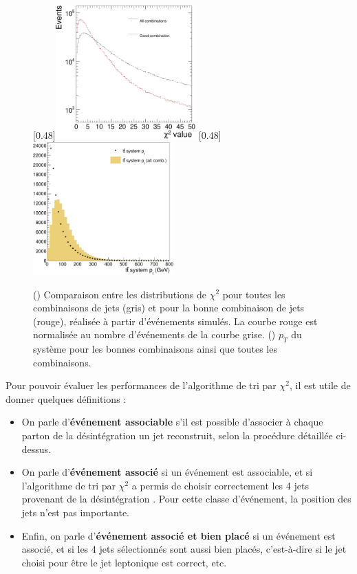 \begin{figure}[tbp] \centering
    \subcaptionbox{\label{fig:chi2_distribution}}[0.48\textwidth]{\includegraphics[width=0.48\textwidth]{chapitre6/figs/chi2/chi2_distribution.pdf}} \hfill
    \subcaptionbox{\label{fig:chi2_ptsyst}}[0.48\textwidth]{\includegraphics[width=0.48\textwidth]{chapitre6/figs/chi2/chi2_discrimant_combinations_pt_syst.pdf}}
    \caption{() Comparaison entre les distributions de $\chi^2$ pour toutes les combinaisons de jets (\textcolor{bleu_gris}{gris}) et pour la bonne combinaison de jets (\textcolor{rouge_grandmere}{rouge}), réalisée à partir d'événements \ttbar simulés. La courbe \textcolor{rouge_grandmere}{rouge} est normalisée au nombre d'événements de la courbe \textcolor{bleu_gris}{grise}. () $p_T$ du système \ttbar pour les bonnes combinaisons ainsi que toutes les combinaisons.}
\end{figure}

Pour pouvoir évaluer les performances de l'algorithme de tri par $\chi^2$, il est utile de donner quelques définitions :

\begin{itemize} \label{page:chi2_def}
    \item On parle d'\textbf{événement associable} s'il est possible d'associer à chaque parton de la désintégration \ttbar un jet reconstruit, selon la procédure détaillée ci-dessus.
    \item On parle d'\textbf{événement associé} si un événement est associable, et si l'algorithme de tri par $\chi^2$ a permis de choisir correctement les 4 jets provenant de la désintégration \ttbar. Pour cette classe d'événement, la position des jets n'est pas importante.
    \item Enfin, on parle d'\textbf{événement associé et bien placé} si un événement est associé, et si les 4 jets sélectionnés sont aussi bien placés, c'est-à-dire si le jet choisi pour être le jet \Pbottom leptonique est correct, etc.
\end{itemize}

